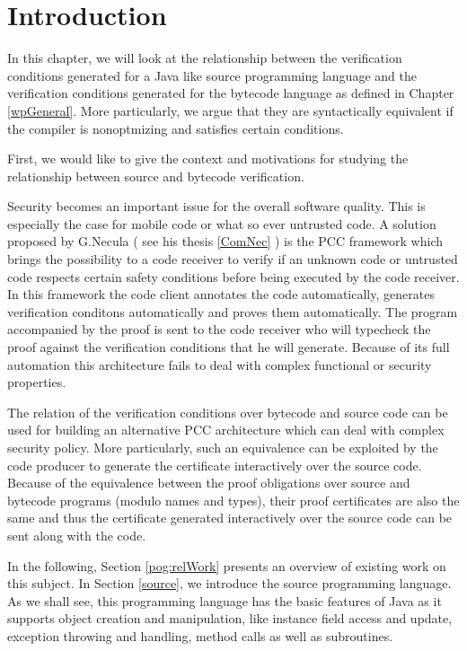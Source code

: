 \section{Introduction}

In this chapter, we will look at the relationship between
the verification conditions generated for a Java like source programming 
language and the verification conditions generated for the bytecode language 
as defined in Chapter \ref{wpGeneral}. More particularly, we 
argue that they are syntactically equivalent if the compiler is nonoptmizing and satisfies certain 
conditions.
  

First, we would like to give the 
context and motivations for studying the relationship 
between source and bytecode verification.


 Security becomes an important issue for the overall software quality.
This is especially the case for mobile code or what so ever untrusted code. 
A solution  proposed by G.Necula ( see his thesis \ref{ComNec} ) 
is the PCC framework which brings the possibility to a  code receiver to 
verify if an unknown code  or untrusted code respects certain safety conditions before being executed by the code receiver.
In this framework the code client annotates the code automatically, generates verification conditons automatically
 and proves them automatically.
The  program accompanied by the proof  is sent to the code receiver  who will typecheck the proof against 
the verification conditions that he will generate.
Because of its full automation this architecture fails to deal with complex functional or security properties.


The relation of the verification conditions over bytecode and source code can be used for building an
 alternative PCC architecture which can deal with complex security policy. 
More particularly, such an equivalence can be exploited by the code producer to generate
 the certificate interactively over the source code. Because of the
equivalence between the proof obligations over source and bytecode programs (modulo names and types), 
their  proof certificates are also the same and thus the certificate generated interactively over the
 source code can be sent along with the code.   




In the following, Section \ref{pog:relWork} presents an overview of existing work on this subject.
 In Section \ref{source},  we introduce the source programming language. As we shall see,
this programming language has the basic features of Java as it supports object creation and manipulation, like instance 
field access and  update, 
 exception throwing and handling, method calls as well as subroutines.

